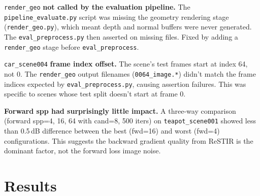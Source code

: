 \texttt{render\_geo} \textbf{not called by the evaluation pipeline.}
The \texttt{pipeline\_evaluate.py} script was missing the geometry rendering
stage (\texttt{render\_geo.py}), which meant depth and normal buffers were
never generated. The \texttt{eval\_preprocess.py} then asserted on missing
files. Fixed by adding a \texttt{render\_geo} stage before
\texttt{eval\_preprocess}.

\texttt{car\_scene004} \textbf{frame index offset.}
The scene's test frames start at index 64, not 0. The \texttt{render\_geo}
output filenames (\texttt{0064\_image.*}) didn't match the frame indices
expected by \texttt{eval\_preprocess.py}, causing assertion failures. This
was specific to scenes whose test split doesn't start at frame 0.

\textbf{Forward spp had surprisingly little impact.}
A three-way comparison (forward spp=4, 16, 64 with cand=8, 500 iters) on
\texttt{teapot\_scene001} showed less than 0.5\,dB difference between the
best (fwd=16) and worst (fwd=4) configurations. This suggests the backward
gradient quality from ReSTIR is the dominant factor, not the forward loss
image noise.

\section{Results}

